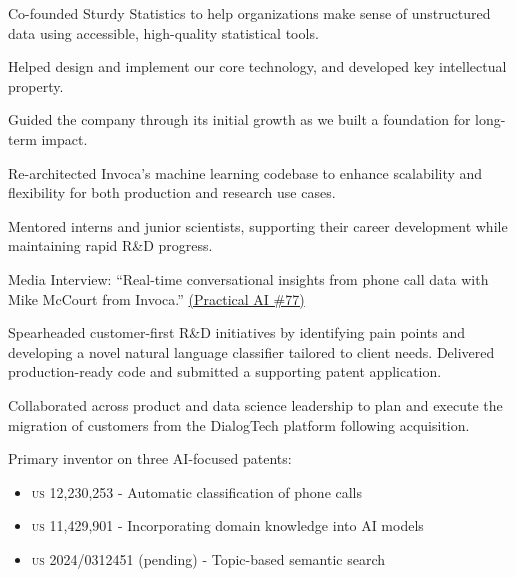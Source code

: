 
\begin{innerlist}
\item Co-founded Sturdy Statistics to help organizations make sense of unstructured data using accessible, high-quality statistical tools.
\item Helped design and implement our core technology, and developed key intellectual property.
\item Guided the company through its initial growth as we built a foundation for long-term impact.
\end{innerlist}



\begin{innerlist}
\item Re-architected Invoca's machine learning codebase to enhance scalability and flexibility for both production and research use cases.
\item Mentored interns and junior scientists, supporting their career development while maintaining rapid R\&D progress.
\item Media Interview: ``Real-time conversational insights from phone call data with Mike McCourt from Invoca.'' \href{https://practicalai.fm/77}{(Practical AI \#77)}  
\end{innerlist}



\begin{innerlist}
\item Spearheaded customer-first R\&D initiatives by identifying pain points and developing a novel natural language classifier tailored to client needs. Delivered production-ready code and submitted a supporting patent application.
\item Collaborated across product and data science leadership to plan and execute the migration of customers from the DialogTech platform following acquisition.
\item Primary inventor on three AI-focused patents:
  \begin{itemize}
    \item \textsc{\MakeTextLowercase{US 12,230,253}} - Automatic classification of phone calls
    \item \textsc{\MakeTextLowercase{US 11,429,901}} - Incorporating domain knowledge into AI models
    \item \textsc{\MakeTextLowercase{US 2024/0312451}} (pending) - Topic-based semantic search
  \end{itemize}
\end{innerlist}



